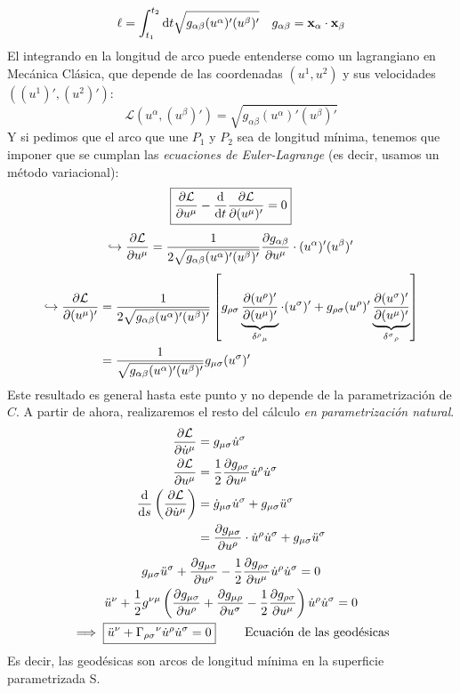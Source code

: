 $$
\ell =\int _{t_1}^{t_2} \odif{t} \sqrt{g_{\alpha \beta }(u^\alpha )'(u^\beta )'} \quad g_{\alpha \beta }=\mathbf{x}_\alpha \cdot \mathbf{x}_\beta 
$$
El integrando en la longitud de arco puede entenderse como un lagrangiano en Mecánica Clásica, que depende de las coordenadas $(u^1,u^2)$ y sus velocidades $((u^1)',(u^2)')$:
$$
\mathcal{L}(u^\alpha ,(u^\beta )')=\sqrt{g_{\alpha \beta }(u^\alpha )'(u^\beta )'}
$$
Y si pedimos que el arco que une $P_1$ y $P_2$ sea de longitud mínima, tenemos que imponer que se cumplan las \emph{ecuaciones de Euler-Lagrange} (es decir, usamos un método variacional):
$$
\boxed{\pdv{\mathcal{L}}{u^\mu }-\dv{}{t}\pdv{\mathcal{L}}{(u^\mu )'}=0}
$$
$$\hookrightarrow \pdv{\mathcal{L}}{u^\mu }=\frac{1}{2\sqrt{g_{\alpha \beta }(u^\alpha )'(u^\beta )'}}\pdv{g_{\alpha \beta }}{u^\mu }\cdot (u^\alpha )'(u^\beta )' $$
\begin{equation*}
    \begin{split}
        \hookrightarrow \pdv{\mathcal{L}}{(u^\mu )'}&=\frac{1}{2\sqrt{g_{\alpha \beta }(u^\alpha )'(u^\beta )'}}\left [ g_{\rho \sigma } \underbrace{\pdv{(u^\rho )'}{(u^\mu )'}}_{\delta ^\rho {}_\mu }\cdot (u^\sigma )'+g_{\rho \sigma }(u^\rho )'\underbrace{\pdv{(u^\sigma )'}{(u^\mu )'}}_{\delta ^\sigma {}_\rho } \right ]\\
        &=\frac{1}{\sqrt{g_{\alpha \beta }(u^\alpha )'(u^\beta )'}} g_{\mu \sigma }(u^\sigma )'
    \end{split}
\end{equation*}
Este resultado es general hasta este punto y no depende de la parametrización de $C$. A partir de ahora, realizaremos el resto del cálculo \emph{en parametrización natural}.
\begin{align*}
    \pdv{\mathcal{L}}{\dot{u}^\mu }&= g_{\mu \sigma } \dot{u}^\sigma \\
    \pdv{\mathcal{L}}{u^\mu }&=\frac{1}{2}\pdv{g_{\rho \sigma }}{u^\mu }\dot{u}^\rho \dot{u}^\sigma \\
    \dv{}{s}\left ( \pdv{\mathcal{L}}{\dot{u}^\mu } \right )&=\dot{g}_{\mu \sigma }\dot{u} ^\sigma +g_{\mu \sigma }\ddot{u}^\sigma \\
    &=\pdv{g_{\mu \sigma }}{u^\rho }\cdot \dot{u}^\rho \dot{u}^\sigma +g_{\mu \sigma }\ddot{u}^\sigma 
\end{align*}
\begin{gather*}
    g_{\mu \sigma }\ddot{u}^\sigma +\pdv{g_{\mu \sigma }}{u^\rho }-\frac{1}{2} \pdv{g_{\rho \sigma }}{u^\mu }\dot{u}^\rho \dot{u}^\sigma=0\\
    \ddot{u}^\nu +\frac{1}{2}g^{\nu \mu }\left ( \pdv{g_{\mu \sigma }}{u^\rho }+\pdv{g_{\mu \rho }}{u^\sigma }-\frac{1}{2}\pdv{g_{\rho \sigma }}{u^\mu } \right )\dot{u}^\rho \dot{u}^\sigma =0\\
    \implies \boxed{\ddot{u}^\nu +\Gamma _{\rho \sigma }{}^\nu \dot{u}^\rho \dot{u}^\sigma=0} \qquad \text{ Ecuación de las geodésicas}
\end{gather*}
Es decir, las geodésicas son arcos de longitud mínima en la superficie parametrizada S.


